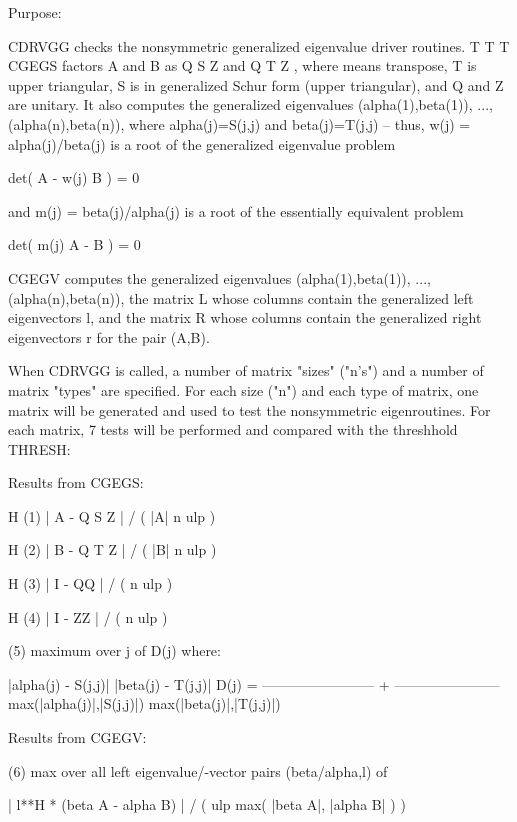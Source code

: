 \begin{DoxyParagraph}{Purpose\+: }
\begin{DoxyVerb} CDRVGG  checks the nonsymmetric generalized eigenvalue driver
 routines.
                               T          T        T
 CGEGS factors A and B as Q S Z  and Q T Z , where   means
 transpose, T is upper triangular, S is in generalized Schur form
 (upper triangular), and Q and Z are unitary.  It also
 computes the generalized eigenvalues (alpha(1),beta(1)), ...,
 (alpha(n),beta(n)), where alpha(j)=S(j,j) and beta(j)=T(j,j) --
 thus, w(j) = alpha(j)/beta(j) is a root of the generalized
 eigenvalue problem

     det( A - w(j) B ) = 0

 and m(j) = beta(j)/alpha(j) is a root of the essentially equivalent
 problem

     det( m(j) A - B ) = 0

 CGEGV computes the generalized eigenvalues (alpha(1),beta(1)), ...,
 (alpha(n),beta(n)), the matrix L whose columns contain the
 generalized left eigenvectors l, and the matrix R whose columns
 contain the generalized right eigenvectors r for the pair (A,B).

 When CDRVGG is called, a number of matrix "sizes" ("n's") and a
 number of matrix "types" are specified.  For each size ("n")
 and each type of matrix, one matrix will be generated and used
 to test the nonsymmetric eigenroutines.  For each matrix, 7
 tests will be performed and compared with the threshhold THRESH:

 Results from CGEGS:

                  H
 (1)   | A - Q S Z  | / ( |A| n ulp )

                  H
 (2)   | B - Q T Z  | / ( |B| n ulp )

               H
 (3)   | I - QQ  | / ( n ulp )

               H
 (4)   | I - ZZ  | / ( n ulp )

 (5)   maximum over j of D(j)  where:

                     |alpha(j) - S(j,j)|        |beta(j) - T(j,j)|
           D(j) = ------------------------ + -----------------------
                  max(|alpha(j)|,|S(j,j)|)   max(|beta(j)|,|T(j,j)|)

 Results from CGEGV:

 (6)   max over all left eigenvalue/-vector pairs (beta/alpha,l) of

    | l**H * (beta A - alpha B) | / ( ulp max( |beta A|, |alpha B| ) )


\end{DoxyVerb}
\end{DoxyParagraph}
